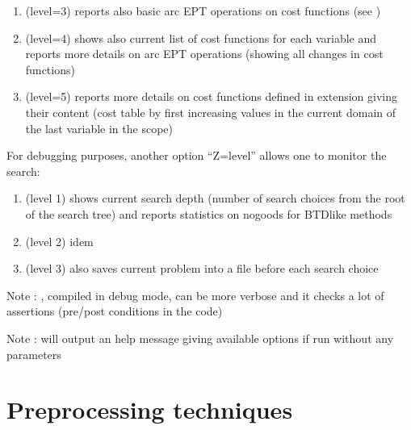 \documentclass[letterpaper,10pt,openany,oneside,english]{sphinxmanual}
\begin{document}
\begin{fulllineitems}
\begin{enumerate}
\item {} 
\sphinxAtStartPar
(level=3) reports also basic arc EPT operations on cost functions (see {\hyperref[\detokenize{ref/ref_modules:group__softac}]{}})

\item {} 
\sphinxAtStartPar
(level=4) shows also current list of cost functions for each variable and reports more details on arc EPT operations (showing all changes in cost functions)

\item {} 
\sphinxAtStartPar
(level=5) reports more details on cost functions defined in extension giving their content (cost table by first increasing values in the current domain of the last variable in the scope)

\end{enumerate}


\sphinxAtStartPar
For debugging purposes, another option “\sphinxhyphen{}Z=level” allows one to monitor the search:\begin{enumerate}
%
\item {} 
\sphinxAtStartPar
(level 1) shows current search depth (number of search choices from the root of the search tree) and reports statistics on nogoods for BTD\sphinxhyphen{}like methods

\item {} 
\sphinxAtStartPar
(level 2) idem

\item {} 
\sphinxAtStartPar
(level 3) also saves current problem into a file before each search choice

\end{enumerate}


\sphinxAtStartPar
Note : , compiled in debug mode, can be more verbose and it checks a lot of assertions (pre/post conditions in the code)

\sphinxAtStartPar
Note :  will output an help message giving available options if run without any parameters 

\end{fulllineitems}



\section{Preprocessing techniques}
\label{\detokenize{ref/ref_modules:preprocessing-techniques}}
\end{document}
